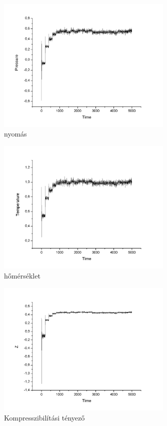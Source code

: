 \documentclass[paper=a4, fontsize=11pt]{article}
\begin{document}
\begin{figure}[H]
    \centering
    \includegraphics[width=0.75\textwidth]{P}
    \caption{nyomás}
\end{figure}

\begin{figure}[H]
    \centering
    \includegraphics[width=0.75\textwidth]{T}
    \caption{hőmérséklet}
\end{figure}


\begin{figure}[H]
    \centering
    \includegraphics[width=0.75\textwidth]{Z}
    \caption{Kompresszibilítási tényező}
\end{figure}
\end{document}
